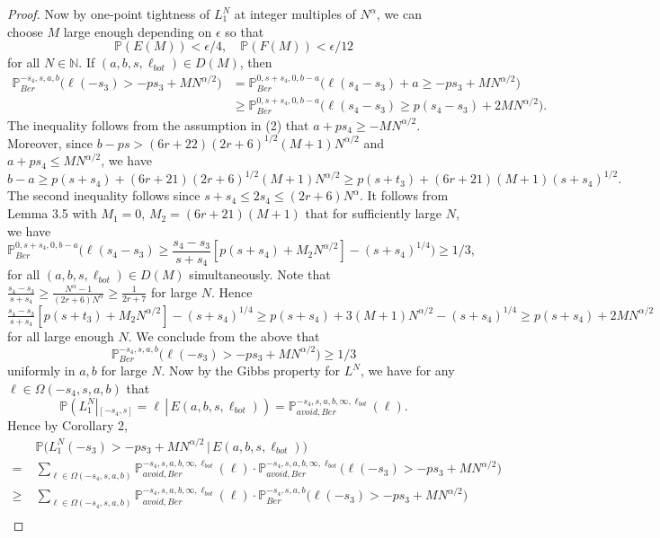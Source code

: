 \documentclass[12pt]{article}
\begin{document}
\begin{proof}
		Now by one-point tightness of $L_1^N$ at integer multiples of $N^\alpha$, we can choose $M$ large enough depending on $\epsilon$ so that
		\[
		\mathbb{P}(E(M)) < \epsilon/4, \quad \mathbb{P}(F(M)) < \epsilon/12
		\]
		for all $N\in\mathbb{N}$. If $(a,b,s,\ell_{bot})\in D(M)$, then
		\begin{align*}
		\mathbb{P}^{-s_4,s,a,b}_{Ber}\Big( \ell(-s_3) > -ps_3 + MN^{\alpha/2}\Big) &= \mathbb{P}^{0,s+s_4,0,b-a}_{Ber}\Big(\ell(s_4-s_3) + a \geq -ps_3 + MN^{\alpha/2}\Big)\\
		&\geq \mathbb{P}^{0,s+s_4,0,b-a}_{Ber}\Big(\ell(s_4-s_3) \geq p(s_4-s_3) + 2MN^{\alpha/2}\Big).
		\end{align*}
		The inequality follows from the assumption in (2) that $a+ps_4 \geq -MN^{\alpha/2}$. Moreover, since $b-ps > (6r+22)(2r+6)^{1/2}(M+1)N^{\alpha/2}$ and $a+ps_4 \leq MN^{\alpha/2}$, we have 
		\[
		b-a \geq p(s+s_4) + (6r+21)(2r+6)^{1/2}(M+1)N^{\alpha/2} \geq p(s+t_3) + (6r+21)(M+1)(s+s_4)^{1/2}.
		\]  
		 The second inequality follows since $s+s_4 \leq 2s_4 \leq (2r+6)N^{\alpha}$. It follows from Lemma 3.5 with $M_1 = 0$, $M_2 = (6r+21)(M+1)$ that for sufficiently large $N$, we have
		\[
		 \mathbb{P}^{0,s+s_4,0,b-a}_{Ber}\Big(\ell(s_4-s_3) \geq \frac{s_4-s_3}{s+s_4}[p(s+s_4) + M_2 N^{\alpha/2}] - (s+s_4)^{1/4}\Big) \geq 1/3,
		\]
		for all $(a,b,s,\ell_{bot}) \in D(M)$ simultaneously. Note that $\frac{s_4-s_3}{s+s_4} \geq \frac{N^\alpha - 1}{(2r+6)N^\alpha} \geq \frac{1}{2r+7}$
		for large $N$. Hence $\frac{s_4-s_3}{s+s_4}[p(s+t_3) + M_2 N^{\alpha/2}] - (s+s_4)^{1/4} \geq p(s+s_4) + 3(M+1)N^{\alpha/2} - (s+s_4)^{1/4}\geq p(s+s_4) + 2MN^{\alpha/2}$ for all large enough $N$. We conclude from the above that
		\[
		\mathbb{P}^{-s_4,s,a,b}_{Ber}\Big(\ell(-s_3) > -ps_3 + MN^{\alpha/2}\Big) \geq 1/3
		\]
		uniformly in $a,b$ for large $N$. Now by the Gibbs property for $L^N$, we have for any $\ell\in\Omega(-s_4,s,a,b)$ that
		\[
		\mathbb{P}(L_1^N|_{[-s_4,s]} = \ell\,|\,E(a,b,s,\ell_{bot})) = \mathbb{P}^{-s_4,s,a,b,\infty,\ell_{bot}}_{avoid, Ber}(\ell).
		\]
		Hence by Corollary 2,
		\begin{align*}
		&\mathbb{P}\big( L_1^N(-s_3) > -ps_3 + MN^{\alpha/2}\,\big|\,E(a,b,s,\ell_{bot})\big)\\
		= \; & \sum_{\ell\in\Omega(-s_4,s,a,b)} \mathbb{P}^{-s_4,s,a,b,\infty,\ell_{bot}}_{avoid, Ber}(\ell)\cdot \mathbb{P}^{-s_4,s,a,b,\infty,\ell_{bot}}_{avoid, Ber}\big(\ell(-s_3) > -ps_3 + MN^{\alpha/2}\big)\\
		\geq \; & \sum_{\ell\in\Omega(-s_4,s,a,b)} \mathbb{P}^{-s_4,s,a,b,\infty,\ell_{bot}}_{avoid, Ber}(\ell)\cdot \mathbb{P}^{-s_4,s,a,b}_{Ber}\big(\ell(-s_3) > -ps_3 + MN^{\alpha/2}\big)\\

\end{align*}
\end{proof}
\end{document}
